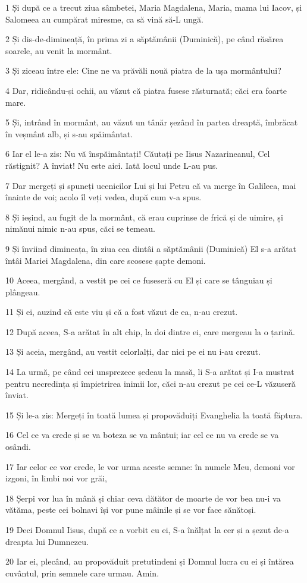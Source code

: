 \par 1 Și după ce a trecut ziua sâmbetei, Maria Magdalena, Maria, mama lui Iacov, și Salomeea au cumpărat miresme, ca să vină să-L ungă.
\par 2 Și dis-de-dimineață, în prima zi a săptămânii (Duminică), pe când răsărea soarele, au venit la mormânt.
\par 3 Și ziceau între ele: Cine ne va prăvăli nouă piatra de la ușa mormântului?
\par 4 Dar, ridicându-și ochii, au văzut că piatra fusese răsturnată; căci era foarte mare.
\par 5 Și, intrând în mormânt, au văzut un tânăr șezând în partea dreaptă, îmbrăcat în veșmânt alb, și s-au spăimântat.
\par 6 Iar el le-a zis: Nu vă înspăimântați! Căutați pe Iisus Nazarineanul, Cel răstignit? A înviat! Nu este aici. Iată locul unde L-au pus.
\par 7 Dar mergeți și spuneți ucenicilor Lui și lui Petru că va merge în Galileea, mai înainte de voi; acolo îl veți vedea, după cum v-a spus.
\par 8 Și ieșind, au fugit de la mormânt, că erau cuprinse de frică și de uimire, și nimănui nimic n-au spus, căci se temeau.
\par 9 Și înviind dimineața, în ziua cea dintâi a săptămânii (Duminică) El s-a arătat întâi Mariei Magdalena, din care scosese șapte demoni.
\par 10 Aceea, mergând, a vestit pe cei ce fuseseră cu El și care se tânguiau și plângeau.
\par 11 Și ei, auzind că este viu și că a fost văzut de ea, n-au crezut.
\par 12 După aceea, S-a arătat în alt chip, la doi dintre ei, care mergeau la o țarină.
\par 13 Și aceia, mergând, au vestit celorlalți, dar nici pe ei nu i-au crezut.
\par 14 La urmă, pe când cei unsprezece ședeau la masă, li S-a arătat și I-a mustrat pentru necredința și împietrirea inimii lor, căci n-au crezut pe cei ce-L văzuseră înviat.
\par 15 Și le-a zis: Mergeți în toată lumea și propovăduiți Evanghelia la toată făptura.
\par 16 Cel ce va crede și se va boteza se va mântui; iar cel ce nu va crede se va osândi.
\par 17 Iar celor ce vor crede, le vor urma aceste semne: în numele Meu, demoni vor izgoni, în limbi noi vor grăi,
\par 18 Șerpi vor lua în mână și chiar ceva dătător de moarte de vor bea nu-i va vătăma, peste cei bolnavi își vor pune mâinile și se vor face sănătoși.
\par 19 Deci Domnul Iisus, după ce a vorbit cu ei, S-a înălțat la cer și a șezut de-a dreapta lui Dumnezeu.
\par 20 Iar ei, plecând, au propovăduit pretutindeni și Domnul lucra cu ei și întărea cuvântul, prin semnele care urmau. Amin.


